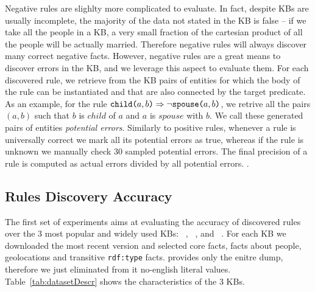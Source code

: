 Negative rules are slighlty more complicated to evaluate. In fact, despite KBs are usually incomplete, the majority of the data not stated in the KB is false -- if we take all the people in a KB, a very small fraction of the cartesian product of all the people will be actually married. Therefore negative rules will always discover many correct negative facts. However, negative rules are a great means to discover errors in the KB, and we leverage this aspect to evaluate them. For each discovered rule, we retrieve from the KB pairs of entities for which the body of the rule can be instantiated and that are also connected by the target predicate. As an example, for the rule $\texttt{child(}a,b\texttt{)} \Rightarrow \neg \texttt{spouse(}a,b\texttt{)}$, we retrive all the pairs $(a,b)$ such that $b$ is $child$ of $a$ and $a$ is $spouse$ with $b$. We call these generated pairs of entities \emph{potential errors}. Similarly to positive rules, whenever a rule is universally correct we mark all its potential errors as true, whereas if the rule is unknown we manually check 30 sampled potential errors. The final precision of a rule is computed as actual errors divided by all potential errors.
.

\subsection{Rules Discovery Accuracy} \label{sec:gen_evaluation}
The first set of experiments aims at evaluating the accuracy of discovered rules over the 3 most popular and widely used KBs: \dbpedia~\cite{bizer2009dbpedia}, \yago~\cite{suchanek2007yago}, and \wikidata~\cite{vrandevcic2014wikidata}. For each KB we downloaded the most recent version and selected core facts, facts about people, geolocations and transitive \texttt{rdf:type} facts. \wikidata provides only the enitre dump, therefore we just eliminated from it no-english literal values. Table~\ref{tab:datasetDescr} shows the characteristics of the 3 KBs.

